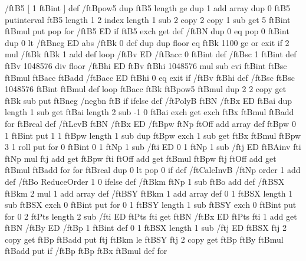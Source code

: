 {{    /ftB5 [ 1 ftBint ] def      %
    /ftBpow5 { %
      dup ftB5 length ge {
        dup 1 add array dup 0 ftB5 putinterval
        ftB5 length 1 2 index length 1 sub {
          2 copy 2 copy 1 sub get 5 ftBint ftBmul put pop } for
        /ftB5 ED } if
      ftB5 exch get } def
    /ftBN {
      dup 0 eq { pop 0 ftBint }{
        dup 0 lt /ftBneg ED abs /ftBk 0 def
        { dup dup floor eq ftBk 1100 ge or { exit } if 2 mul /ftBk ftBk 1 add def } loop
        /ftBv ED /ftBacc 0 ftBint def /ftBsc 1 ftBint def
        { ftBv 1048576 div floor /ftBhi ED
          ftBv ftBhi 1048576 mul sub cvi ftBint ftBsc ftBmul ftBacc ftBadd /ftBacc ED
          ftBhi 0 eq { exit } if
          /ftBv ftBhi def /ftBsc ftBsc 1048576 ftBint ftBmul def } loop
        ftBacc ftBk ftBpow5 ftBmul
        dup 2 2 copy get ftBk sub put
        ftBneg { /negbn ftB } if
      } ifelse } def
    /ftPolyB { %
      ftBN /ftBx ED ftBai dup length 1 sub get
      ftBai length 2 sub -1 0 { ftBai exch get exch ftBx ftBmul ftBadd } for
      ftBreal } def
    /ftLevB { %
      ftBN /ftBx ED
      /ftBpw ftNp ftOff add array def
      ftBpw 0 1 ftBint put
      1 1 ftBpw length 1 sub { dup ftBpw exch 1 sub get ftBx ftBmul ftBpw 3 1 roll put } for
      0 ftBint
      0 1 ftNp 1 sub { /fti ED
        0 1 ftNp 1 sub { /ftj ED
          ftBAinv fti ftNp mul ftj add get
          ftBpw fti ftOff add get ftBmul ftBpw ftj ftOff add get ftBmul ftBadd
        } for
      } for
      ftBreal dup 0 lt { pop 0 } if } def
    /ftCalcInvB {
      /ftNp order 1 add def
      /ftBo ReduceOrder { 1 }{ 0 } ifelse def
      /ftBkm ftNp 1 sub ftBo add def
      /ftBSX ftBkm 2 mul 1 add array def /ftBSY ftBkm 1 add array def
      0 1 ftBSX length 1 sub { ftBSX exch 0 ftBint put } for
      0 1 ftBSY length 1 sub { ftBSY exch 0 ftBint put } for
      0 2 ftPts length 2 sub { /fti ED
        ftPts fti get ftBN /ftBx ED ftPts fti 1 add get ftBN /ftBy ED
        /ftBp 1 ftBint def
        0 1 ftBSX length 1 sub { /ftj ED
          ftBSX ftj 2 copy get ftBp ftBadd put
          ftj ftBkm le { ftBSY ftj 2 copy get ftBp ftBy ftBmul ftBadd put } if
          /ftBp ftBp ftBx ftBmul def
        } for
}}}}
